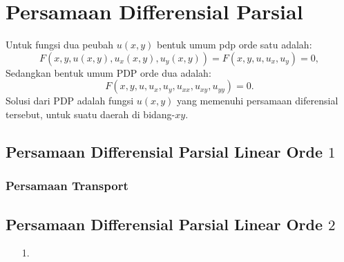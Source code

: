 \documentclass[11pt,a4paper]{article}
\theoremstyle{plain}
\theoremstyle{definition}
\theoremstyle{remark}
\begin{document}
\section{Persamaan Differensial Parsial}
Untuk fungsi dua peubah $u(x,y)$ bentuk umum pdp orde satu adalah:
$$ F(x,y,u(x,y),u_{x}(x,y),u_{y}(x,y))=F(x,y,u,u_x,u_y)=0,$$
Sedangkan bentuk umum PDP orde dua adalah:
$$F(x,y,u,u_{x},u_{y},u_{xx},u_{xy},u_{yy})=0.$$
Solusi dari PDP adalah fungsi $u(x,y)$ yang memenuhi persamaan diferensial tersebut, untuk suatu daerah di bidang-$xy$. 
\subsection{Persamaan Differensial Parsial Linear Orde $1$}
\subsubsection{Persamaan Transport}
\subsection{Persamaan Differensial Parsial Linear Orde $2$}


\begin{enumerate}
	\item[1.]
	
\end{enumerate}





	
\end{document}
